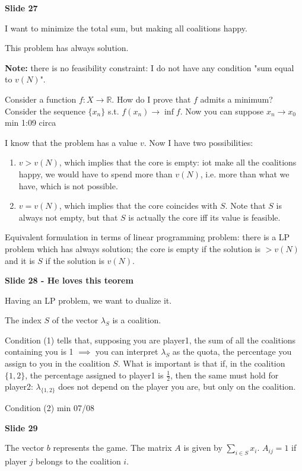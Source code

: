 \documentclass[pt11,a4paper,twoside,reqno,openright]{paper}
\begin{document}
\bigskip
\noindent \textbf{Slide 27}

\noindent I want to minimize the total sum, but making all coalitions happy. 

\noindent This problem has always solution.

\noindent \textbf{Note:} there is no feasibility constraint: I do not have 
any condition "sum equal to $v(N)$".

\noindent Consider a function $f:X \rightarrow \mathbb{R}$. How do I prove that 
$f$ admits a minimum? Consider the sequence $\{x_n\}$ s.t. $f(x_n) \rightarrow 
\inf{f}$. Now you can suppose $x_n \rightarrow x_0$
{\huge min 1:09 circa}

\noindent I know that the problem has a value $v$. Now I have two possibilities:
\begin{enumerate}
\item $v > v(N)$, which implies that the core is empty: iot make all the 
coalitions happy, we would have to spend more than $v(N)$, i.e. more than what 
we have, which is not possible.
\item $v=v(N)$, which implies that the core coincides with $S$. Note that $S$ 
is always not empty, but that $S$ is actually the core iff its value is 
feasible. 
\end{enumerate}

\noindent Equivalent formulation in terms of linear programming problem: there 
is a LP problem which has always solution; the core is empty if the solution is 
$>v(N)$ and it is $S$ if the solution is $v(N)$.

\bigskip
\noindent \textbf{Slide 28 - He loves this teorem}

\noindent Having an LP problem, we want to dualize it.

\noindent The index $S$ of the vector $\lambda_S$ is a coalition.

\noindent Condition (1) tells that, supposing you are player1, the sum of all 
the coalitions containing you is 1 $\implies$ you can interpret $\lambda_S$ as 
the quota, the percentage you assign to you in the coalition $S$. What is 
important is that if, in the coalition $\{1,2\}$, the percentage assigned to 
player1 is $\frac{1}{2}$, then the same must hold for player2: 
$\lambda_{\{1,2\}}$ does not depend on the player you are, but only on the 
coalition.

\noindent Condition (2) {\huge min 07/08}

\bigskip
\noindent \textbf{Slide 29}

\noindent The vector $b$ represents the game. The matrix $A$ is given by 
$\sum_{i \in S}{x_i}$. $A_{ij}=1$ if player $j$ belongs to the coalition $i$.
\end{document}
